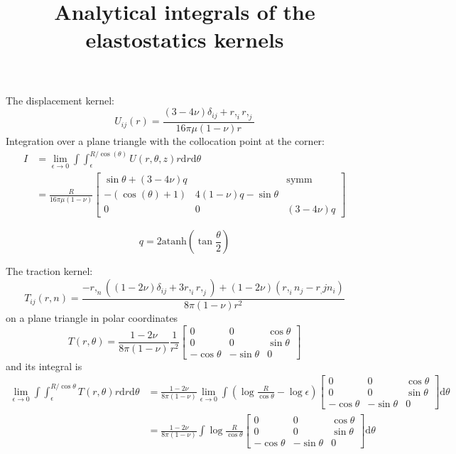 \documentclass{article}
\title{Analytical integrals of the elastostatics kernels}
\newcommand{\atanh}{\mathrm{atanh}}
\newcommand{\td}{\mathrm{d}}
\begin{document}
\maketitle

The displacement kernel:
%
\begin{equation}
U_{ij}(r) = \frac{(3-4\nu)\delta_{ij} + r,_i r,_j}{16\pi\mu(1-\nu)r}
\end{equation}
%
Integration over a plane triangle with the collocation point at the corner:
%
\begin{align}
I &= \lim_{\epsilon\to 0} \int \int_{\epsilon}^{R/\cos(\theta)} U(r,\theta,z) r \td r \td \theta \nonumber \\
&= \frac{R}{16\pi\mu(1-\nu)}
\begin{bmatrix}
\sin\theta + (3-4\nu) q &  &  \text{symm} \\ 
- \left(\cos\!\left(\theta\right) + 1\right) &  4 (1-\nu) q - \sin\theta & \\
0 & 0 & \left(3-4\nu\right)q 
\end{bmatrix}
\end{align}

\begin{equation}
q = 2 \atanh\left(\tan\frac{\theta}{2}\right)
\end{equation}

The traction kernel:
%
\begin{equation}
T_{ij}(r,n) = \frac{-r,_n ((1-2\nu)\delta_{ij} + 3r,_i r,_j) + (1-2\nu) (r,_i n_j - r_,j n_i)}{8\pi(1-\nu)r^2}
\end{equation}
%
on a plane triangle in polar coordinates
%
\begin{equation}
T(r,\theta) = 
\frac{1-2\nu}{8\pi(1-\nu)} \frac{1}{r^2} \begin{bmatrix}
0 & 0 & \cos\theta \\
0 & 0 & \sin\theta \\
-\cos\theta & -\sin\theta & 0
\end{bmatrix}
\end{equation}
%
and its integral is
%
\begin{align}
\lim_{\epsilon \to 0}\int \int_{\epsilon}^{R/\cos\theta} T(r,\theta) r \td r \td \theta
&= 
\frac{1-2\nu}{8\pi(1-\nu)}
\lim_{\epsilon\to0}
\int
\left( \log \frac{R}{\cos\theta} - \log \epsilon \right) \begin{bmatrix}
0 & 0 & \cos\theta \\
0 & 0 & \sin\theta \\
-\cos\theta & -\sin\theta & 0
\end{bmatrix}
\td\theta \nonumber \\
&= 
\frac{1-2\nu}{8\pi(1-\nu)}
\int
\log \frac{R}{\cos\theta} \begin{bmatrix}
0 & 0 & \cos\theta \\
0 & 0 & \sin\theta \\
-\cos\theta & -\sin\theta & 0
\end{bmatrix}
\td\theta \nonumber \\
\end{align}
\end{document}
